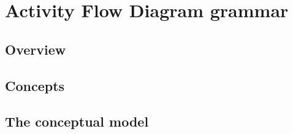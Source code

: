 \chapter{Activity Flow Diagram grammar}
\label{chp:af:grammar}

\section{Overview}

\section{Concepts}

\section{The conceptual model}





